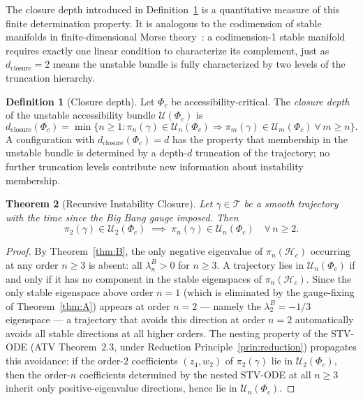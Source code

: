 \documentclass[12pt,a4paper]{article}
\theoremstyle{plain}
\newtheorem{theorem}{Theorem}[section]
\theoremstyle{definition}
\newtheorem{definition}[theorem]{Definition}
\theoremstyle{remark}
\newcommand{\Phic}{\Phi_c}
\newcommand{\Tacc}{\mathcal{T}}
\newcommand{\Uacc}{\mathcal{U}}
\newcommand{\piproj}{\pi}
\newcommand{\Hacc}{\mathcal{H}}
\newcommand{\dclos}{d_{\mathrm{closure}}}
\newcommand{\lBn}[1]{\lambda^B_{#1}}
\begin{document}
The closure depth introduced in Definition~\ref{def:closure_depth} is a quantitative
measure of this finite determination property. It is analogous to the codimension
of stable manifolds in finite-dimensional Morse theory~\cite{Hirsch1974}: a
codimension-1 stable manifold requires exactly one linear condition to characterize
its complement, just as $\dclos = 2$ means the unstable bundle is fully characterized
by two levels of the truncation hierarchy.

\begin{definition}[Closure depth]
\label{def:closure_depth}
Let $\Phic$ be accessibility-critical. The \emph{closure depth} of the unstable
accessibility bundle $\Uacc(\Phic)$ is
\begin{equation}
  \dclos(\Phic)
  = \min\bigl\{n\geq 1 :
    \piproj_n(\gamma)\in\Uacc_n(\Phic)
    \Rightarrow
    \piproj_m(\gamma)\in\Uacc_m(\Phic)
    \ \forall\, m\geq n
  \bigr\}.
  \label{eq:closure_depth}
\end{equation}
A configuration with $\dclos(\Phic) = d$ has the property that membership in the
unstable bundle is determined by a depth-$d$ truncation of the trajectory; no
further truncation levels contribute new information about instability membership.
\end{definition}

\begin{theorem}[Recursive Instability Closure]
\label{thm:C}
Let $\gamma\in\Tacc$ be a smooth trajectory with the time since the Big Bang gauge
imposed. Then
\begin{equation}
  \piproj_2(\gamma)\in\Uacc_2(\Phic)
  \;\implies\;
  \piproj_n(\gamma)\in\Uacc_n(\Phic)
  \quad\forall\,n\geq 2.
  \label{eq:closure_implication}
\end{equation}
\end{theorem}

\begin{proof}
By Theorem~\ref{thm:B}, the only negative eigenvalue of $\piproj_n(\Hacc_c)$
occurring at any order $n\geq 3$ is absent: all $\lBn{n} > 0$ for $n\geq 3$.
A trajectory lies in $\Uacc_n(\Phic)$ if and only if it has no component in the
stable eigenspaces of $\piproj_n(\Hacc_c)$. Since the only stable eigenspace above
order $n=1$ (which is eliminated by the gauge-fixing of Theorem~\ref{thm:A})
appears at order $n=2$ --- namely the $\lBn{2} = -1/3$ eigenspace --- a trajectory
that avoids this direction at order $n=2$ automatically avoids all stable directions
at all higher orders. The nesting property of the STV-ODE (ATV Theorem~2.3, under
Reduction Principle~\ref{prin:reduction}) propagates this avoidance: if the order-$2$
coefficients $(z_4,w_2)$ of $\piproj_2(\gamma)$ lie in $\Uacc_2(\Phic)$, then the
order-$n$ coefficients determined by the nested STV-ODE at all $n\geq 3$ inherit
only positive-eigenvalue directions, hence lie in $\Uacc_n(\Phic)$.
\end{proof}
\end{document}
